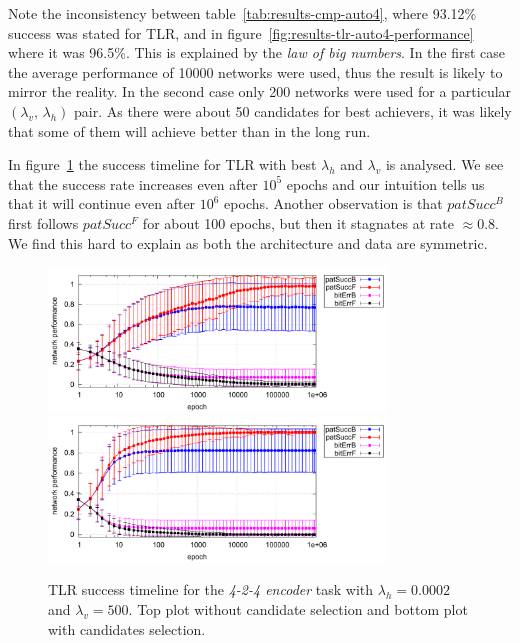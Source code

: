 Note the inconsistency between table~\ref{tab:results-cmp-auto4}, where 93.12\% success was stated for TLR, and in figure~\ref{fig:results-tlr-auto4-performance} where it was 96.5\%. This is explained by the \emph{law of big numbers}. In the first case the average performance of 10000 networks were used, thus the result is likely to mirror the reality. In the second case only 200 networks were used for a particular $(\lambda_v,\,\lambda_h)$ pair. As there were about 50 candidates for best achievers, it was likely that some of them will achieve better than in the long run. 

\label{sec:our-o-fb-dist-diff}
In figure~\ref{fig:results-tlr-auto4-epoch} the success timeline for TLR with best $\lambda_h$ and $\lambda_v$ is analysed. We see that the success rate increases even after $10^5$ epochs and our intuition tells us that it will continue even after $10^6$ epochs. Another observation is that $patSucc^B$ first follows $patSucc^F$ for about 100 epochs, but then it stagnates at rate $\approx0.8$. We find this hard to explain as both the architecture and data are symmetric. %

\begin{figure}[h]
  \centering
  \includegraphics[width=0.8\textwidth]{img/tlr-auto4-best-perf.pdf}\\
  \includegraphics[width=0.8\textwidth]{img/tlr-auto4-best-can.pdf}      
  \caption{TLR success timeline for the \emph{4-2-4 encoder} task with $\lambda_h=0.0002$ and $\lambda_v=500$. Top plot without candidate selection and bottom plot with candidates selection.}
  \label{fig:results-tlr-auto4-epoch} 
\end{figure}

